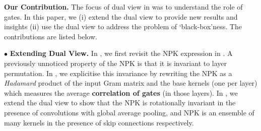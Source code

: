 









\textbf{Our Contribution.} The  focus of dual view in \citep{npk} was to understand the role of gates. In this paper, we (i) extend the dual view to provide new results and insights (ii) use the dual view to address the problem of `black-box'ness. The contributions are listed below.

$\bullet$ \textbf{Extending Dual View.} In , we first revisit the NPK expression in \citep{npk}. A previously unnoticed property of the NPK is that it is invariant to layer permutation. In , we explicitise this invariance by rewriting the NPK as a \emph{Hadamard} product of the input Gram matrix and the base kernels (one per layer) which measures the average \textbf{correlation of gates} (in those layers). In , we extend the dual view to show that the NPK is rotationally invariant in the presence of convolutions with global average pooling, and NPK is an ensemble of many kernels in the presence of skip connections respectively.  %


